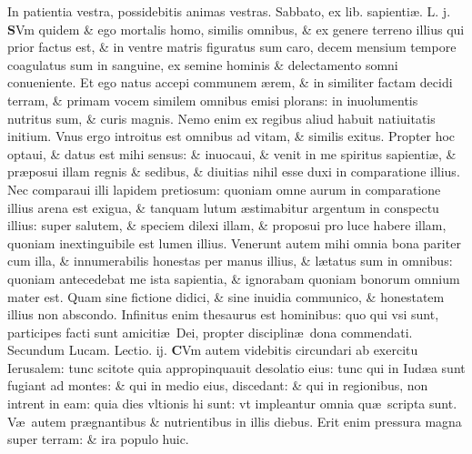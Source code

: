 \documentclass[a5paper,10pt]{book}
\def\leftmarginnote{%
	\lrmarginnote{\hskip -\marginparsep \hskip -6.5em}}
\def\rightmarginnote{%
	\lrmarginnote{\hskip\columnwidth \hskip -1em}}
\def\ae{æ}
\begin{document}
\begin{multicols*}{2}
In patientia vestra, possidebitis animas vestras.
\newline {} \color{red} \hypertarget{SAT-TERTIA-POST-ADV}{Sabbato,} ex lib. sapienti\ae . L. j. \color{black}
\vspace{-1.25em}
\lettrine[lines=2]{\bfseries S}{}Vm\leftmarginnote{\begin{flushright}ca. 7.\end{flushright}} quidem \& ego mortalis homo, similis omnibus, \& ex genere terreno illius qui prior factus est, \& in ventre matris figuratus sum caro, decem mensium tempore coagulatus sum in sanguine, ex semine hominis \& delectamento somni conueniente.
Et ego natus accepi communem \ae rem, \& in similiter factam decidi terram, \& primam vocem similem omnibus emisi plorans: in inuolumentis nutritus sum, \& curis magnis.
Nemo enim ex regibus aliud habuit natiuitatis initium.
Vnus ergo introitus est omnibus ad vitam, \& similis exitus. Propter hoc optaui, \& datus est mihi sensus: \& inuocaui, \& venit in me spiritus sapienti\ae , \& pr\ae posui illam regnis \& sedibus, \& diuitias nihil esse duxi in comparatione illius.
Nec comparaui illi lapidem pretiosum: quoniam omne aurum in comparatione illius arena est exigua, \& tanquam lutum \ae stimabitur argentum in conspectu illius: super salutem, \& speciem dilexi illam, \& proposui pro luce habere illam, quoniam inextinguibile est lumen illius.
Venerunt autem mihi omnia bona pariter cum illa, \& innumerabilis honestas per manus illius, \& l\ae tatus sum in omnibus: quoniam antecedebat me ista sapientia, \& ignorabam quoniam bonorum omnium mater est.
Quam sine fictione didici, \& sine inuidia communico, \& honestatem illius non abscondo.
Infinitus enim thesaurus est hominibus: quo qui vsi sunt, participes facti sunt amiciti\ae \ Dei, propter disciplin\ae \ dona commendati.
\newline \color{red} Secundum Lucam. \hfill Lectio. ij. \color{black}
\vspace{-.25em}
\lettrine[lines=2]{\bfseries \color{red} C}{}Vm\rightmarginnote{c. 21.} autem videbitis circundari ab exercitu Ierusalem: tunc scitote quia appropinquauit desolatio eius: tunc qui in Iud\ae a sunt fugiant ad montes: \& qui in medio eius, discedant: \& qui in regionibus, non intrent in eam: quia dies vltionis hi sunt: vt impleantur omnia qu\ae \ scripta sunt.
V\ae \ autem pr\ae gnantibus \& nutrientibus in illis diebus. Erit enim pressura magna super terram: \& ira populo huic.

\end{multicols*}
\end{document}
